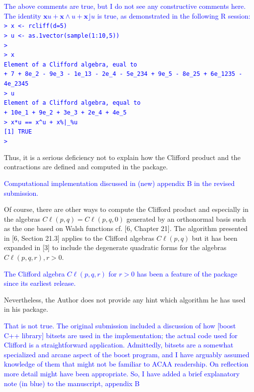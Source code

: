 \documentclass{article}
\newcommand{\cliff}[1]{\ensuremath{C\ell\left(#1\right)}}
\begin{document}
\begin{itemize}
\textcolor{blue}{The above comments are true, but I do not see any
  constructive comments here.  The identity $\mathbf{x}u +
  \mathbf{x}\wedge u+\mathbf{x}\rfloor u$ is true, as demonstrated
  in the following R session:\\[20pt]
{\tt > x <- rcliff(d=5)}\\
{\tt > u <- as.1vector(sample(1:10,5))}\\
{\tt > }\\
{\tt > x}\\
{\tt Element of a Clifford algebra, eual to}\\
{\tt + 7 + 8e\_2 - 9e\_3 - 1e\_13 - 2e\_4 - 5e\_234 + 9e\_5 - 8e\_25 + 6e\_1235 - 4e\_2345}\\
{\tt > u}\\
{\tt Element of a Clifford algebra, equal to}\\
{\tt + 10e\_1 + 9e\_2 + 3e\_3 + 2e\_4 + 4e\_5}\\
{\tt > x*u == x\string^u + x\%|\_\%u}\\
{\tt [1] TRUE}\\
{\tt > }\\
}

Thus, it is a
serious deficiency not to explain how the Clifford product and the
contractions are defined and computed in the package.

\textcolor{blue}{Computational implementation discussed in (new)
  appendix B in the revised submission.}

Of course,
there are other ways to compute the Clifford product and especially in
the algebras $\cliff{p, q} = \cliff{p, q, 0}$ generated by an
orthonormal basis such as the one based on Walsh functions cf. [6,
  Chapter 21]. The algorithm presented in [6, Section 21.3] applies to
the Clifford algebras \cliff{p, q} but it has been expanded in [3] to
include the degenerate quadratic forms for the algebras $\cliff{p, q,
  r}, r > 0$.

\textcolor{blue}{The Clifford algebra \cliff{p,q,r} for $r>0$ has been
  a feature of the package since its earliest release.}

Nevertheless, the Author does not provide any hint
which algorithm he has used in his package.

\textcolor{blue}{That is not true.  The original submission included a
  discussion of how [boost C++ library] bitsets are used in the
  implementation; the actual code used for Clifford is a
  straightforward application.  Admittedly, bitsets are a somewhat
  specialized and arcane aspect of the boost program, and I have
  arguably assumed knowledge of them that might not be familiar to
  ACAA readership.  On reflection more detail might have been
  appropriate.  So, I have added a brief explanatory note (in
  \textcolor{blue}{blue}) to the manuscript, appendix B}


\end{itemize}
\end{document}
